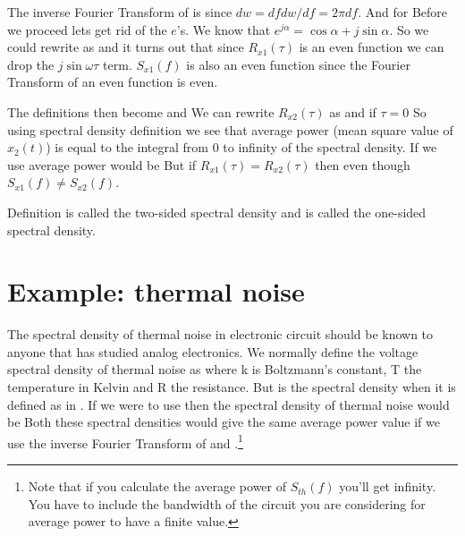The inverse Fourier Transform of  is
since $dw = df dw/df = 2\pi df$. And for 
Before we proceed lets get rid of the $e$'s. We know that $e^{j\alpha} =
\cos \alpha + j \sin \alpha$. So we could rewrite  as
and it turns out that since $R_{x1}(\tau)$ is an even function we can
drop the $j\sin{\omega \tau}$ term. $S_{x1}(f)$ is also an even function
since the Fourier Transform of an even function is  even. 

The definitions then become
and
We can rewrite $R_{x2}(\tau)$ as 
and if $\tau = 0$
So using spectral density definition  we see that average
power (mean square value of $x_2(t)$) is equal to the integral from 0 to
infinity of the spectral density. If we use  average power
would be
But if $R_{x1}(\tau) = R_{x2}(\tau)$ then 
even though $S_{x1}(f) \neq S_{x2}(f)$.

Definition  is  called the two-sided spectral density
and  is called the one-sided spectral density.

\section{Example: thermal noise}
The spectral density of thermal noise in electronic circuit should be
known to anyone that has studied analog electronics. We normally
define the voltage spectral density of thermal noise as
where k is Boltzmann's constant, T the temperature in Kelvin and R the
resistance. But  is the spectral density when it is
defined as in . If we were to use  then the
spectral density of thermal noise would be
Both these spectral densities would give the same average power
value if we use the inverse Fourier Transform of  and
.\footnote{Note that if you calculate the average power of
  $S_{th}(f)$ you'll get infinity. You have to include the bandwidth of
  the circuit you are considering for average power to have a finite value.}

